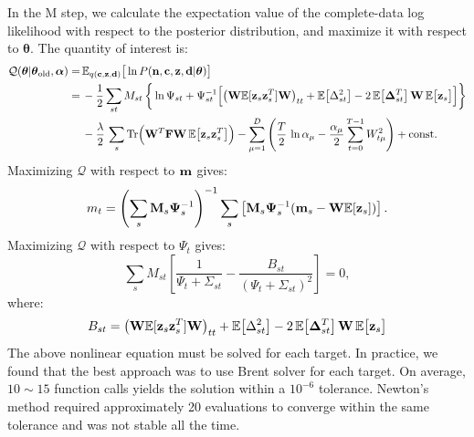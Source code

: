 \documentclass[nofootinbib,amssymb,amsmath]{revtex4}
\newcommand{\vd}{{\bf d}}
\newcommand{\vc}{{\bf c}}
\newcommand{\vz}{{\bf z}}
\newcommand{\vn}{{\bf n}}
\newcommand{\vm}{{\bf m}}
\newcommand{\vM}{{\bf M}}
\newcommand{\vW}{{\bf W}}
\newcommand{\vF}{{\bf F}}
\newcommand{\vPsi}{{\bf \Psi}}
\newcommand{\vDelta}{{\bf \Delta}}
\newcommand{\vtheta}{{\boldsymbol \theta}}
\newcommand{\valpha}{{\boldsymbol \alpha}}
\newcommand{\EE}{\mathbb{E}}
\begin{document}
In the M step, we calculate the expectation value of the complete-data log likelihood with respect to the posterior distribution, and maximize it with respect to $\vtheta$. The quantity of interest is:
%
\begin{align}
\mathcal{Q}(\vtheta|\vtheta_\mathrm{old}, \valpha) =&\, \EE_{q(\vc, \vz, \vd)}\big[\ln P(\vn, \vc, \vz, \vd | \vtheta)\big]\nonumber\\
=&\, - \frac{1}{2}\sum_{st} M_{st} \, \bigg\{\ln \Psi_{st} + \Psi_{st}^{-1}\Big[\big(\vW \EE[\vz_s \vz_s^T] \vW\big)_{tt} + \EE\big[\Delta_{st}^2\big] - 2 \, \EE\big[\vDelta_{st}^T\big] \, \vW \, \EE\big[\vz_s\big]\Big]\bigg\}\nonumber\\
&\,- \frac{\lambda}{2} \, \sum_s \mathrm{Tr}\Big(\vW^T \vF \vW \, \EE\big[\vz_s \vz_s^T\big]\Big) - \sum_{\mu=1}^{D}\left(\frac{T}{2} \, \ln \alpha_\mu -\frac{\alpha_\mu}{2} \sum_{t=0}^{T-1} W_{t\mu}^2  \right) + \mathrm{const.}
\label{eq:posterior_exp_log_likelihood}
\end{align}
%
Maximizing $\mathcal{Q}$ with respect to $\vm$ gives:
\begin{align}
m_t = \left(\sum_s \vM_s \vPsi_{s}^{-1} \right)^{-1} \sum_s \left[ \vM_s \vPsi_{s}^{-1}  (\vm_{s}  - \vW  \EE[\vz_{s}] ) \right].
\end{align}
Maximizing $\mathcal{Q}$ with respect to $\Psi_t$ gives:
\begin{equation}\label{eq:psi_stationarity}
\sum_s M_{st}\left[\frac{1}{\Psi_t + \Sigma_{st}} - \frac{B_{st}}{(\Psi_t + \Sigma_{st})^2} \right] = 0,
\end{equation}
where:
\begin{equation}
B_{st} = \big(\vW \EE[\vz_s \vz_s^T] \vW\big)_{tt} + \EE\big[\Delta_{st}^2\big] - 2 \, \EE\big[\vDelta_{st}^T\big] \, \vW \, \EE\big[\vz_s\big]
\end{equation}
The above nonlinear equation must be solved for each target. In practice, we found that the best approach was to use Brent solver for each target. On average, $10 \sim 15$ function calls yields the solution within a $10^{-6}$ tolerance. Newton's method required approximately 20 evaluations to converge within the same tolerance and was not stable all the time.\\
\end{document}
